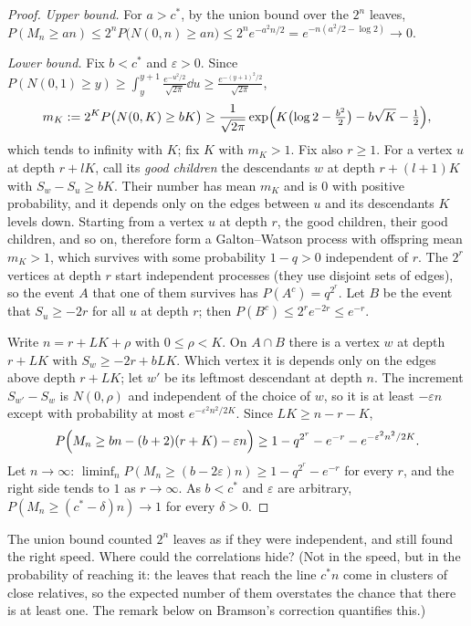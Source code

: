 \begin{proof}
\emph{Upper bound.} For $a>c^*$, by the union bound over the $2^n$ leaves, $P(M_n\ge an)\le2^nP\bigl(N(0,n)\ge an\bigr)\le2^ne^{-a^2n/2}=e^{-n(a^2/2-\log2)}\to0$.

\emph{Lower bound.} Fix $b<c^*$ and $\varepsilon>0$. Since $P(N(0,1)\ge y)\ge\int_y^{y+1}\frac{e^{-u^2/2}}{\sqrt{2\pi}}\dd u\ge\frac{e^{-(y+1)^2/2}}{\sqrt{2\pi}}$,
\[
m_K:=2^KP\bigl(N(0,K)\ge bK\bigr)\ge\frac1{\sqrt{2\pi}}\exp\Bigl(K\bigl(\log2-\tfrac{b^2}2\bigr)-b\sqrt K-\tfrac12\Bigr),
\]
which tends to infinity with $K$; fix $K$ with $m_K>1$. Fix also $r\ge1$. For a vertex $u$ at depth $r+lK$, call its \emph{good children} the descendants $w$ at depth $r+(l+1)K$ with $S_w-S_u\ge bK$. Their number has mean $m_K$ and is $0$ with positive
probability, and it depends only on the edges between $u$ and its descendants $K$ levels down. Starting from a vertex $u$ at depth $r$, the good children, their good children, and so on, therefore form a Galton--Watson process with
offspring mean $m_K>1$, which survives with some probability $1-q>0$ independent of $r$. The $2^r$ vertices at depth $r$ start independent processes (they use disjoint sets of edges), so the event $A$ that one of them survives has
$P(A^c)=q^{2^r}$. Let $B$ be the event that $S_u\ge-2r$ for all $u$ at depth $r$; then $P(B^c)\le2^re^{-2r}\le e^{-r}$.

Write $n=r+LK+\rho$ with $0\le\rho<K$. On $A\cap B$ there is a vertex $w$ at depth $r+LK$ with $S_w\ge-2r+bLK$. Which vertex it is depends only on the edges above depth $r+LK$; let $w'$ be its leftmost descendant at depth $n$. The
increment $S_{w'}-S_w$ is $N(0,\rho)$ and independent of the choice of $w$, so it is at least $-\varepsilon n$ except with probability at most $e^{-\varepsilon^2n^2/2K}$. Since $LK\ge n-r-K$,
\[
P\Bigl(M_n\ge bn-(b+2)(r+K)-\varepsilon n\Bigr)\ge1-q^{2^r}-e^{-r}-e^{-\varepsilon^2n^2/2K}.
\]
Let $n\to\infty$: $\liminf_nP(M_n\ge(b-2\varepsilon)n)\ge1-q^{2^r}-e^{-r}$ for every $r$, and the right side tends to $1$ as $r\to\infty$. As $b<c^*$ and $\varepsilon$ are arbitrary, $P(M_n\ge(c^*-\delta)n)\to1$ for every $\delta>0$.
\end{proof}

\begin{think}
The union bound counted $2^n$ leaves as if they were independent, and still found the right speed. Where could the correlations hide? (Not in the speed, but in the probability of reaching it: the leaves that reach the line $c^*n$ come in clusters of close relatives, so the expected number of them overstates the chance that there is at least one. The remark below on Bramson's correction quantifies this.)
\end{think}

